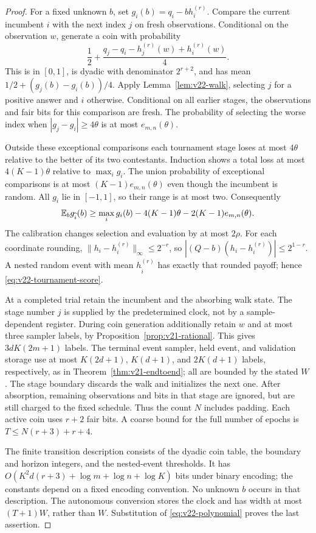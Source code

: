 \begin{proof}
For a fixed unknown $b$, set
$g_i(b)=q_i-bh_i^{(r)}$. Compare the current incumbent $i$ with the next
index $j$ on fresh observations. Conditional on the observation $w$,
generate a coin with probability
\begin{equation}\label{eq:v22-comparison-coin}
 \frac12+\frac{q_j-q_i-h_j^{(r)}(w)+h_i^{(r)}(w)}4.
\end{equation}
This is in $[0,1]$, is dyadic with denominator $2^{r+2}$, and has mean
$1/2+(g_j(b)-g_i(b))/4$. Apply Lemma~\ref{lem:v22-walk}, selecting
$j$ for a positive answer and $i$ otherwise. Conditional on all earlier
stages, the observations and fair bits for this comparison are fresh.
The probability of selecting the worse index when
$|g_j-g_i|\ge4\theta$ is at most $e_{m,n}(\theta)$.

Outside these exceptional comparisons each tournament stage loses at
most $4\theta$ relative to the better of its two contestants. Induction
shows a total loss at most $4(K-1)\theta$ relative to
$\max_i g_i$. The union probability of exceptional comparisons is at
most $(K-1)e_{m,n}(\theta)$ even though the incumbent is random.
All $g_i$ lie in $[-1,1]$, so their range is at most two. Consequently
\[
 \mathbb E_b g_{\widehat i}(b)\ge\max_i g_i(b)-4(K-1)\theta
                                -2(K-1)e_{m,n}(\theta).
\]
The calibration changes selection and evaluation by at most $2\rho$.
For each coordinate rounding, $\|h_i-h_i^{(r)}\|_\infty\le2^{-r}$,
so $|(Q-b)(h_i-h_i^{(r)})|\le2^{1-r}$. A nested random event with mean
$h_{\widehat i}^{(r)}$ has exactly that rounded payoff; hence
\eqref{eq:v22-tournament-score}.

At a completed trial retain the incumbent and the absorbing walk state.
The stage number $j$ is supplied by the predetermined clock, not by a
sample-dependent register. During coin generation additionally retain
$w$ and at most three sampler labels, by
Proposition~\ref{prop:v21-rational}. This gives $3dK(2m+1)$ labels.
The terminal event sampler, held event, and validation storage use at
most $K(2d+1)$, $K(d+1)$, and $2K(d+1)$ labels, respectively, as in
Theorem~\ref{thm:v21-endtoend}; all are bounded by the stated $W$.
The stage boundary discards the walk and initializes the next one.
After absorption, remaining observations and bits in that stage are
ignored, but are still charged to the fixed schedule. Thus the count
$N$ includes padding. Each active coin uses $r+2$ fair bits. A coarse
bound for the full number of epochs is $T\le N(r+3)+r+4$.

The finite transition description consists of the dyadic coin table,
the boundary and horizon integers, and the nested-event thresholds. It
has $O(K^2d(r+3)+\log m+\log n+\log K)$ bits under binary encoding;
the constants depend on a fixed encoding convention. No unknown $b$
occurs in that description. The autonomous conversion stores the clock
and has width at most $(T+1)W$, rather than $W$. Substitution of
\eqref{eq:v22-polynomial} proves the last assertion.
\end{proof}

